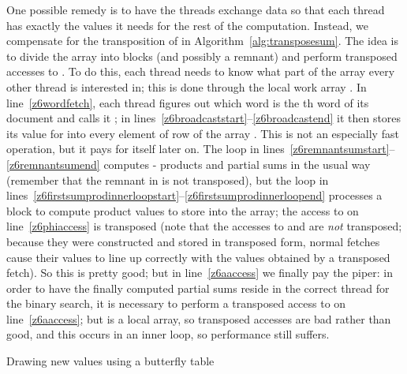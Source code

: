 \documentclass[10pt,nohyperref]{sigplanconf}
\newcommand*\Assign[2]{\State #1  #2}
\newcommand*\LocalArray[1]{\State {\bf local array} #1}
\newcommand*\RegisterArray[1]{\State {\bf register array} #1}
\newcommand*\Bind[2]{\State {\bf let} #1  #2}
\newcommand*\ProcTwoX[1]{\State\hbox{\hskip-\algorithmicindent\hskip\wd\proctwobox#1}}
\newcommand*\UseCodeChunk[1]{\State {#1}}
\begin{document}
One possible remedy is to have the threads exchange data so that each thread has exactly the  values
it needs for the rest of the computation.  Instead, we compensate for the transposition of
 in Algorithm~\ref{alg:transposesum}.
The idea is to divide the array  into blocks (and possibly a remnant)
and perform transposed accesses to .  To do this, each thread needs to know what part of
the array  every other thread is interested in; this is done through the  local work array .
In line~\ref{z6wordfetch}, each thread figures out which word is the th word of its document and calls it ;
in lines~\hbox{\ref{z6broadcaststart}--\ref{z6broadcastend}} it then stores its value for  into every element of row 
of the array .
This is not an especially fast operation, but it pays for itself later on.
The loop in lines~\hbox{\ref{z6remnantsumstart}--\ref{z6remnantsumend}} computes - products and partial sums 
in the usual way (remember that the remnant in  is not transposed), but the loop in
lines~\hbox{\ref{z6firstsumprodinnerloopstart}--\ref{z6firstsumprodinnerloopend}}
processes a block to compute product values to store into the  array;
the access to  on line~\ref{z6phiaccess} is transposed (note that the accesses to 
and  are \emph{not} transposed; because they were constructed and stored in transposed form,
normal fetches cause their values to line up correctly with the  values obtained by a transposed fetch).
So this is pretty good; but in line~\ref{z6aaccess} we finally pay the piper: in order to have the finally computed partial sums 
reside in the correct thread for the binary search, it is necessary to perform a transposed access to 
on line~\ref{z6aaccess}; but  is a local array, so transposed accesses are bad rather than good,
and this occurs in an inner loop, so performance still suffers.



\begin{algorithm}[t]
\caption{Drawing new  values using a butterfly table}\label{alg:simddraw}
\end{algorithm}
\end{document}
